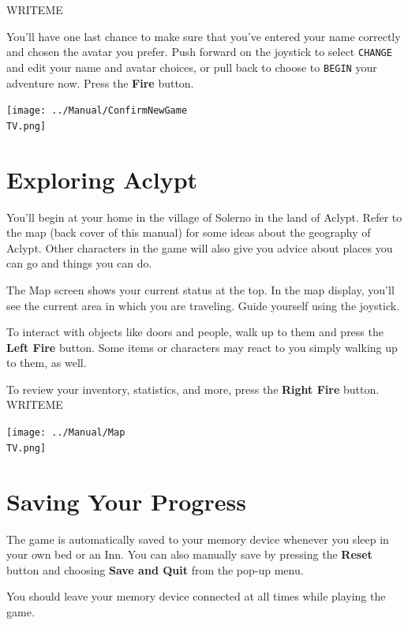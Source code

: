 \documentclass[10pt,twocolumn,openany,article]{memoir}
\newcommand\TV{NTSC}
\newcommand\TV{PAL}
\begin{document}
WRITEME

You'll have one  last chance to make sure that  you've entered your name
correctly and chosen the avatar you prefer. Push forward on
the joystick to select \texttt{CHANGE}  and edit your name and avatar
choices, or  pull back  to choose to  \texttt{BEGIN} your  adventure now.
Press the \textbf{Fire} button.

\begin{center}
  \texttt{[image: ../Manual/ConfirmNewGame\\TV.png]}
\end{center}

\fi

\section{Exploring Aclypt}

You'll begin  at your  home in  the village  of Solerno  in the  land of
Aclypt. Refer  to the  map (back  cover of this  manual) for  some ideas
about the  geography of Aclypt. Other  characters in the game  will also
give you advice about places you can go and things you can do.

The Map screen shows your current status at the top. In the map display,
you'll see the  current area in which you are  traveling. Guide yourself
using the joystick.

To interact  with objects  like doors  and people, walk  up to  them and
press the \textbf{Left Fire} button.  Some items or characters may react
to you simply walking up to them, as well.

To review your inventory, statistics,  and more, press the \textbf{Right
  Fire} button. WRITEME

\begin{center}
  \texttt{[image: ../Manual/Map\\TV.png]}
\end{center}

\section{Saving Your Progress}

The game is automatically saved to your memory device whenever you sleep
in your own  bed or an Inn.  You can also manually save  by pressing the
\textbf{Reset}  button  and choosing  \textbf{Save  and  Quit} from  the
pop-up menu.

You should leave your memory device connected at all times while playing
the game.
\end{document}
